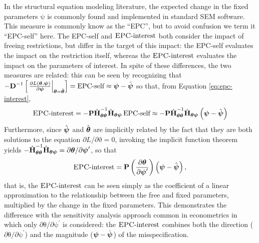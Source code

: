\documentclass[letterpaper,12pt]{article}
\newcommand\vm[1]{%
\bm{\mathrm{#1}}}
\newcommand{\param}{\vm{\theta}}
\newcommand{\bpsi}{\vm{\psi}}
\newcommand{\that}{\hat{\vm{\theta}}}
\newcommand{\da}{\textrm{{\sc {EPC}}-interest}}
\begin{document}
In the structural equation modeling literature, the expected change in the fixed parameters $\bpsi$  is commonly found and implemented in standard SEM software. This measure is commonly know as the ``EPC'', but to avoid confusion we term it ``EPC-self'' here. The EPC-self and $\da{}$ both consider the impact of freeing restrictions, but differ in the target of this impact: the EPC-self evaluates the impact on the restriction itself, whereas the $\da{}$ evaluates the impact on the parameters of interest. In spite of these differences, the two measures are related: this can be seen by recognizing that $- \vm{D}^{-1}
		\left[ \left.\frac{\partial L(\param, \bpsi)}{\partial \bpsi}\right|_{\param = \that} \right] = \text{EPC-self} \approx \bpsi - \hat{\bpsi}$ so that, from Equation \ref{eq:epc-interest}, 
\begin{equation}
\da=- \vm{P} \hat{\vm{H}}^{-1}_{\param\param} \hat{\vm{H}}_{\param\bpsi} \,\text{EPC-self} \approx
- \vm{P} \hat{\vm{H}}^{-1}_{\param\param} \hat{\vm{H}}_{\param\bpsi} \left( \bpsi - \hat{\bpsi}\right)
\end{equation}
Furthermore, since $\hat{\bpsi}$ and $\hat{\param}$ are implicitly related by the fact that they are both solutions to the equation $\partial L / \partial \vm\vartheta = \vm{0}$, invoking the implicit function theorem yields $- \hat{\vm{H}}^{-1}_{\param\param} \hat{\vm{H}}_{\param\bpsi}  = \partial \param / \partial \bpsi^\prime$, so that 
\begin{equation}
	\da = \vm{P} \left( \frac{\partial \param} {\partial \bpsi^\prime} \right) \left( \bpsi - \hat{\bpsi}\right),
	\label{eq:epc-linear}
\end{equation}
that is, the $\da{}$ can be seen simply as the coefficient of a linear approximation to the relationship between the free and fixed parameters, multiplied by the change in the fixed parameters. This demonstrates the difference with the sensitivity analysis approach common in econometrics \citep[p. 168]{magnus2007local} in which only $\partial \param / \partial \bpsi^\prime$ is considered: the $\da{}$ combines both the direction ($\partial \param / \partial \bpsi^\prime$) and the magnitude ($ \bpsi - \hat{\bpsi}$) of the misspecification.
\end{document}
